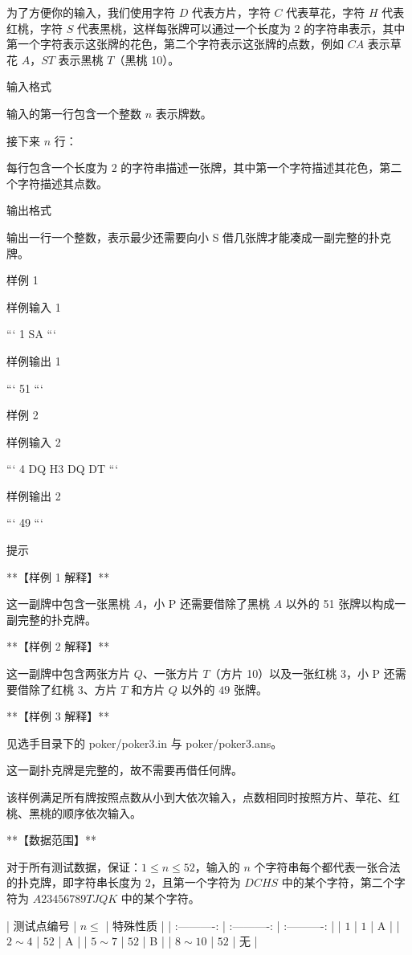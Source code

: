 \documentclass[12pt,twiside,a4paper]{ctexbook}
\numberwithin{chapter}{part}
\begin{document}
为了方便你的输入，我们使用字符 $ D$ 代表方片，字符 $ C$ 代表草花，字符 $ H$ 代表红桃，字符 $ S$ 代表黑桃，这样每张牌可以通过一个长度为 $2$ 的字符串表示，其中第一个字符表示这张牌的花色，第二个字符表示这张牌的点数，例如 ${CA}$ 表示草花 $ A$，${ST}$ 表示黑桃 $ T$（黑桃 10）。

 输入格式

输入的第一行包含一个整数 $n$ 表示牌数。

接下来 $n$ 行：

每行包含一个长度为 $2$ 的字符串描述一张牌，其中第一个字符描述其花色，第二个字符描述其点数。

 输出格式

输出一行一个整数，表示最少还需要向小 S 借几张牌才能凑成一副完整的扑克牌。

 样例 1

 样例输入 1

```
1
SA
```

 样例输出 1

```
51
```

 样例 2

 样例输入 2

```
4
DQ
H3
DQ
DT
```

 样例输出 2

```
49
```

 提示

**【样例 1 解释】**

这一副牌中包含一张黑桃 $ A$，小 P 还需要借除了黑桃 $ A$ 以外的 51 张牌以构成一副完整的扑克牌。

**【样例 2 解释】**

这一副牌中包含两张方片 $ Q$、一张方片 $ T$（方片 10）以及一张红桃 3，小 P 还需要借除了红桃 3、方片 $ T$ 和方片 $ Q$ 以外的 $49$ 张牌。

**【样例 3 解释】**

见选手目录下的 poker/poker3.in 与 poker/poker3.ans。

这一副扑克牌是完整的，故不需要再借任何牌。

该样例满足所有牌按照点数从小到大依次输入，点数相同时按照方片、草花、红桃、黑桃的顺序依次输入。

**【数据范围】**

对于所有测试数据，保证：$1 \leq n \leq 52$，输入的 $n$ 个字符串每个都代表一张合法的扑克牌，即字符串长度为 $2$，且第一个字符为 ${D C H S}$ 中的某个字符，第二个字符为 ${A 2 3 4 5 6 7 8 9 T J Q K}$ 中的某个字符。

| 测试点编号 | $n \leq$ | 特殊性质 |
| :----------: | :----------: | :----------: |
| $1$ | $1$ | A |
| $2\sim 4$ | $52$ | A |
| $5\sim 7$ | $52$ | B |
| $8\sim 10$ | $52$ | 无 |
\end{document}
